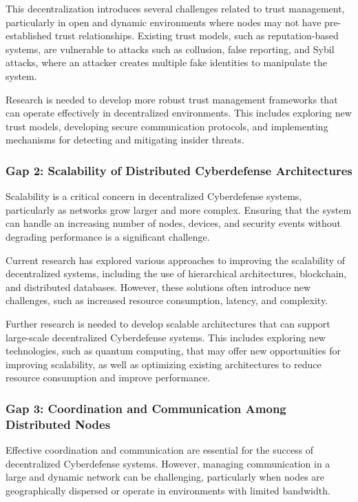 This decentralization introduces several challenges related to trust management, particularly in open and dynamic environments where nodes may not have pre-established trust relationships. Existing trust models, such as reputation-based systems, are vulnerable to attacks such as collusion, false reporting, and Sybil attacks, where an attacker creates multiple fake identities to manipulate the system.

Research is needed to develop more robust trust management frameworks that can operate effectively in decentralized environments. This includes exploring new trust models, developing secure communication protocols, and implementing mechanisms for detecting and mitigating insider threats.

\subsubsection{Gap 2: Scalability of Distributed Cyberdefense Architectures}

Scalability is a critical concern in decentralized Cyberdefense systems, particularly as networks grow larger and more complex. Ensuring that the system can handle an increasing number of nodes, devices, and security events without degrading performance is a significant challenge.

Current research has explored various approaches to improving the scalability of decentralized systems, including the use of hierarchical architectures, blockchain, and distributed databases. However, these solutions often introduce new challenges, such as increased resource consumption, latency, and complexity.

Further research is needed to develop scalable architectures that can support large-scale decentralized Cyberdefense systems. This includes exploring new technologies, such as quantum computing, that may offer new opportunities for improving scalability, as well as optimizing existing architectures to reduce resource consumption and improve performance.

\subsubsection{Gap 3: Coordination and Communication Among Distributed Nodes}

Effective coordination and communication are essential for the success of decentralized Cyberdefense systems. However, managing communication in a large and dynamic network can be challenging, particularly when nodes are geographically dispersed or operate in environments with limited bandwidth.

